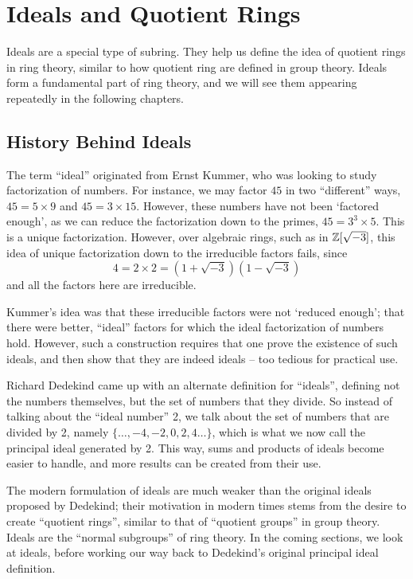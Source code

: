 \chapter{Ideals and Quotient Rings}
Ideals are a special type of subring. They help us define the idea of quotient rings in ring theory, similar to how quotient ring are defined in group theory. Ideals form a fundamental part of ring theory, and we will see them appearing repeatedly in the following chapters.

\section{History Behind Ideals}
The term ``ideal'' originated from Ernst Kummer, who was looking to study factorization of numbers. For instance, we may factor $45$ in two ``different'' ways, $45 = 5 \times 9$ and $45 = 3 \times 15$. However, these numbers have not been `factored enough', as we can reduce the factorization down to the primes, $45 = 3^3 \times 5$. This is a unique factorization. However, over algebraic rings, such as in $\mathbb{Z}[\sqrt{-3}]$, this idea of unique factorization down to the irreducible factors fails, since
\[
    4 = 2 \times 2 = (1+\sqrt{-3})(1-\sqrt{-3})
\]
and all the factors here are irreducible.

Kummer's idea was that these irreducible factors were not `reduced enough'; that there were better, ``ideal'' factors for which the ideal factorization of numbers hold. However, such a construction requires that one prove the existence of such ideals, and then show that they are indeed ideals -- too tedious for practical use. 

Richard Dedekind came up with an alternate definition for ``ideals'', defining not the numbers themselves, but the set of numbers that they divide. So instead of talking about the ``ideal number'' 2, we talk about the set of numbers that are divided by 2, namely $\{\dots, -4, -2, 0, 2, 4 \dots\}$, which is what we now call the principal ideal generated by 2. This way, sums and products of ideals become easier to handle, and more results can be created from their use.

The modern formulation of ideals are much weaker than the original ideals proposed by Dedekind; their motivation in modern times stems from the desire to create ``quotient rings'', similar to that of ``quotient groups'' in group theory. Ideals are the ``normal subgroups'' of ring theory. In the coming sections, we look at ideals, before working our way back to Dedekind's original principal ideal definition.

